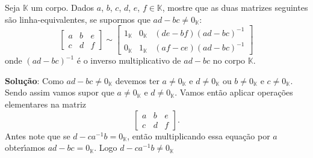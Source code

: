 \documentclass[12pt]{article}
\newcommand{\cp}[1]{\mathbb{#1}}
\begin{document}
Seja $\cp{K}$ um corpo. Dados $a$, $b$, $c$, $d$, $e$, $f \in \cp{K}$, mostre que as duas matrizes seguintes s\~ao linha-equivalentes, se supormos que $ad - bc \ne 0_{\cp{K}}$:
\[
    \left[\begin{array}{cc|c}
      a & b & e\\
      c & d & f
    \end{array}\right] \sim \left[\begin{array}{cc|c}
      1_{\cp{K}} & 0_{\cp{K}} & (de - bf)(ad - bc)^{-1}\\
      0_{\cp{K}} & 1_{\cp{K}} & (af - ce)(ad - bc)^{-1}
    \end{array}\right]
\]
onde $(ad - bc)^{-1}$ \'e o inverso multiplicativo de $ad - bc$ no corpo $\cp{K}$.

\textbf{Solu{\c c}{\~a}o}: Como $ad - bc \ne 0_{\cp{K}}$ devemos ter $a \ne 0_\cp{K}$ e $d \ne 0_\cp{K}$ ou $b \ne 0_\cp{K}$ e $c \ne 0_\cp{K}$. Sendo assim vamos supor que $a \ne 0_\cp{K}$ e $d \ne 0_\cp{K}$. Vamos ent\~ao aplicar opera\c{c}\~oes elementares na matriz
\[
    \left[\begin{array}{cc|c}
      a & b & e\\
      c & d & f
    \end{array}\right].
\]
Antes note que se $d - ca^{-1}b = 0_\cp{K}$, ent\~ao multiplicando essa equa\c{c}\~ao por $a$ obter{\'\i}amos $ad - bc = 0_\cp{K}$. Logo $d - ca^{-1}b \ne 0_\cp{K}$
\end{document}
